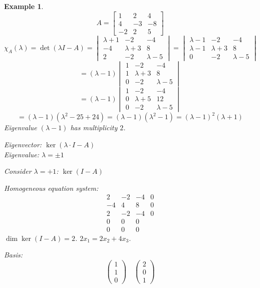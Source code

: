 \documentclass{article}
\newtheorem{example}{Example}  \numberwithin{example}{section}
\begin{document}
\begin{example} %
  \[ A = \begin{bmatrix} 1 & 2 & 4 \\ 4 & -3 & -8 \\ -2 & 2 & 5 \end{bmatrix} \]
  \[
    \chi_A(\lambda) = \det(\lambda I - A) = \begin{vmatrix}
      \lambda+1 & -2 & -4 \\
      -4 & \lambda+3 & 8 \\
      2 & -2 & \lambda-5
    \end{vmatrix}
    = \begin{vmatrix}
      \lambda-1 & -2 & -4 \\
      \lambda-1 & \lambda+3 & 8 \\
      0 & -2 & \lambda-5
    \end{vmatrix}
  \] \[
    = (\lambda - 1) \begin{vmatrix} 1 & -2 & -4 \\ 1 & \lambda+3 & 8 \\ 0 & -2 & \lambda-5 \end{vmatrix}
  \] \[
    = (\lambda - 1) \begin{vmatrix} 1 & -2 & -4 \\ 0 & \lambda+5 & 12 \\ 0 & -2 & \lambda-5 \end{vmatrix}
  \] \[
    = (\lambda-1)(\lambda^2 - 25 + 24) = (\lambda - 1)(\lambda^2 - 1) = (\lambda-1)^2 (\lambda + 1)
  \]
  Eigenvalue $(\lambda-1)$ has multiplicity $2$.

  Eigenvector: $\ker(\lambda \cdot I - A)$ \\
  Eigenvalue: $\lambda = \pm 1$

  Consider $\lambda = +1$: $\ker(I - A)$

  Homogeneous equation system:
  \[
    \begin{array}{ccc|c}
      2 & -2 & -4 & 0 \\
      -4 & 4 & 8 & 0 \\
      2 & -2 & -4 & 0 \\
    \hline
      0 & 0 & 0 & \\
      0 & 0 & 0 &
    \end{array}
  \]
  $\dim\ker(I - A) = 2$. $2x_1 = 2x_2 + 4x_3$.

  Basis:
  \[ \begin{pmatrix} 1 \\ 1 \\ 0 \end{pmatrix} \quad \begin{pmatrix} 2 \\ 0 \\ 1 \end{pmatrix} \]


\end{example}
\end{document}
